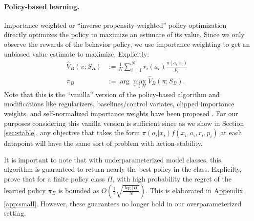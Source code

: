 \paragraph{Policy-based learning.}
Importance weighted or ``inverse propensity weighted'' policy optimization directly optimizes the policy to maximize an estimate of its value. Since we only observe the rewards of the behavior policy, we use importance weighting to get an unbiased value estimate to maximize. Explicitly:
\begin{align}
    \hat V_B(\pi ; S_B) &:= \frac{1}{N}\sum_{i=1}^N r_i(a_i) \frac{\pi(a_i|x_i)}{p_i} \\ \pi_B &:= \arg \max_{\pi \in \Pi} \hat V_B(\pi;S_B). \label{eq:pi}
\end{align}
Note that this is the ``vanilla'' version of the policy-based algorithm and modifications like regularizers, baselines/control variates, clipped importance weights, and self-normalized importance weights have been proposed \citep{bottou2013counterfactual, joachims2018deep, strehl2010learning, swaminathan2015counterfactual, swaminathan2015self}.
For our purposes considering this vanilla version is sufficient since as we show in Section \ref{sec:stable}, any objective that takes the form $ \pi(a_i|x_i) f(x_i, a_i, r_i, p_i)$ at each datapoint will have the same sort of problem with action-stability.



It is important to note that with underparameterized model classes, this algorithm is guaranteed to return nearly the best policy in the class. Explicilty, \citet{strehl2010learning} prove that for a finite policy class $ \Pi$, with high probability the regret of the learned policy $ \pi_B$ is bounded as $ O(\frac{1}{\tau} \sqrt{\frac{\log |\Pi|}{N}})$. This is elaborated in Appendix \ref{app:small}. However, these guarantees no longer hold in our overparameterized setting.



